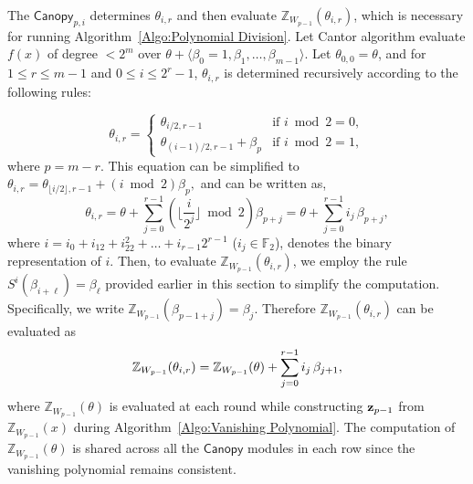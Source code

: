The $\mathsf{Canopy}_{p, i}$ determines $\theta_{i, r}$ and then evaluate $\mathbb{Z}_{W_{p-1}}(\theta_{i, r})$, which is necessary for running Algorithm~\ref{Algo:Polynomial Division}.  Let Cantor algorithm evaluate  $f(x)$ of degree $< 2^m$ over $\theta + \langle \beta_0 = 1, \beta_1, \ldots, \beta_{m-1} \rangle$.  
Let $\theta_{0, 0} = \theta$, and for $1 \leq r \leq m-1$ and $0 \leq i \leq 2^r - 1$, $\theta_{i, r}$ is determined recursively according to the following rules:

\begin{equation*}
	\theta_{i, r} =
	\begin{cases}
		\theta_{i / 2, r - 1} & \text{if } i \bmod 2 = 0,\\
		\theta_{(i - 1) / 2, r - 1} + \beta_{p} & \text{if } i \bmod 2 = 1,
	\end{cases}
\end{equation*}
where $p=m-r$. This equation can be simplified to 
$
\theta_{i, r} = \theta_{\lfloor i / 2 \rfloor, r - 1} + (i \bmod{2}) \beta_{p},
$
and can be written as,
\begin{equation*}
	\theta_{i, r} = \theta + \sum_{j=0}^{r - 1} \left( \lfloor \frac{i}{2^j} \rfloor \bmod{2} \right) \beta_{p+j} = \theta + \sum_{j=0}^{r - 1} i_j \, \beta_{p+j},
\end{equation*}
where $i = i_0 + i_12 + i_22^2 + \dots + i_{r-1}2^{r-1}$ ($i_j \in \mathbb{F}_2$), denotes the binary representation of $i$. Then, to evaluate $\mathbb{Z}_{W_{p-1}}(\theta_{i, r})$, we employ the rule $S^{i}(\beta_{i+\ell}) = \beta_{\ell}$ provided earlier in this section to simplify the computation. Specifically, we write $\mathbb{Z}_{W_{p-1}}(\beta_{p-1 + j}) = \beta_j$. Therefore $\mathbb{Z}_{W_{p-1}}(\theta_{i, r})$ can be evaluated as
\begin{equation*}
	\setlength{\jot}{3pt}  %
	\mathbb{Z}_{W_{p-1}}(\theta_{i, r}) =  \mathbb{Z}_{W_{p-1}}(\theta) + \sum_{j=0}^{r - 1} i_j \, \beta_{j+1},
\end{equation*}
where \(\mathbb{Z}_{W_{p-1}}(\theta)\) is evaluated at each round while constructing \({\bf{z}}_{p-1}\) from \(\mathbb{Z}_{W_{p-1}}(x)\) during Algorithm~\ref{Algo:Vanishing Polynomial}. The computation of \(\mathbb{Z}_{W_{p-1}}(\theta)\) is shared across all the \(\mathsf{Canopy}\) modules in each row since the vanishing polynomial remains consistent. 

